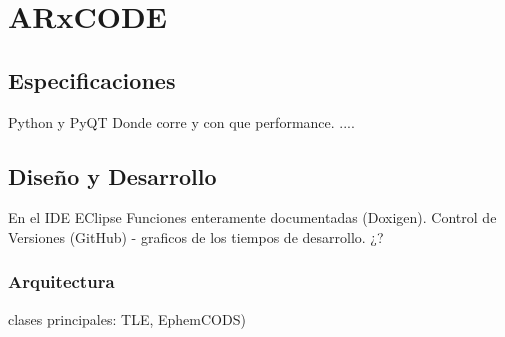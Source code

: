 \chapter{ARxCODE}
\label{chap:arxcode} 

\section{Especificaciones}
Python y PyQT
Donde corre y con que performance.
....


\section{Diseño y Desarrollo}
En el IDE EClipse
Funciones enteramente documentadas (Doxigen).
Control de Versiones (GitHub) - graficos de los tiempos de desarrollo. ¿?


\subsection{Arquitectura}
clases principales: TLE, EphemCODS)